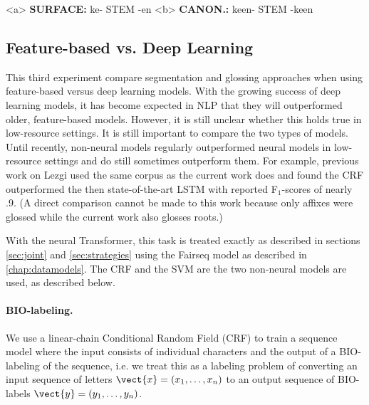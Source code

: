 \pex   
\label{ex:Circumfixes}
\a<a> \textbf{SURFACE:} \hspace{2 mm} ke- \hspace{4 mm}  STEM  \hspace{1 mm} -en
\label{ex:circumsurf}
\a<b> \textbf{CANON.:} \hspace{1 mm} ke\textlangle{}\textrangle{}en- \hspace{1 mm} STEM \hspace{1 mm} -ke\textlangle{}\textrangle{}en
\label{ex:circumcan}
\xe



\subsection{Feature-based vs. Deep Learning}
\label{sec:CRFvNN}

This third experiment compare segmentation and glossing approaches when using feature-based versus deep learning models. With the growing success of deep learning models, it has become expected in NLP that they will outperformed older, feature-based models. However, it is still unclear whether this holds true in low-resource settings. It is still important to compare the two types of models. Until recently, non-neural models regularly outperformed neural models in low-resource settings and do still sometimes outperform them. For example, previous work on Lezgi \citep{moeller_automatic_2018} used the same corpus as the current work does and found the CRF outperformed the then state-of-the-art LSTM with reported F$_1$-scores of nearly .9. (A direct comparison cannot be made to this work because only affixes were glossed while the current work also glosses roots.) 

With the neural Transformer, this task is treated exactly as described in sections \ref{sec:joint} and \ref{sec:strategies} using the Fairseq model as described in \ref{chap:datamodels}. The CRF and the SVM are the two non-neural models are used, as described below.

\paragraph{BIO-labeling.} 
We use a linear-chain Conditional Random Field (CRF) \citep{lafferty2001} to train a sequence model where the input consists of individual characters and the output of a BIO-labeling \citep{ramshaw1999} of the sequence, i.e. we treat this as a labeling problem of converting an input sequence of letters $\vect{x} = (x_1, \ldots, x_n)$ to an output sequence of BIO-labels $\vect{y} = (y_1, \ldots, y_n)$.

